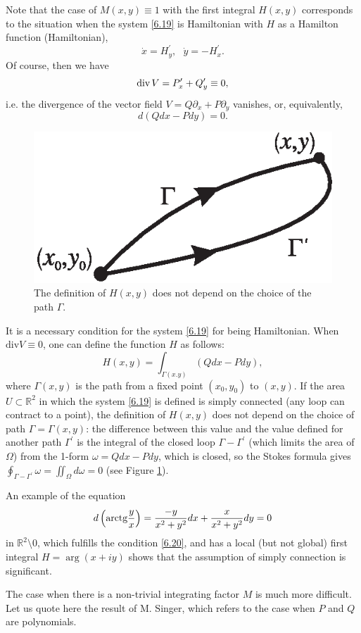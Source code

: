 \begin{example}
	Note that the case of $M (x, y) \equiv 1$ with the first integral $H (x, y)$ corresponds to the situation when the system \eqref{6.19} is Hamiltonian with $H$ as a Hamilton function (Hamiltonian),
	$$
	\dot{x}=H_{y}^{\prime },\text{ \ \ }\dot{y}=-H_{x}^{\prime }.
	$$
	Of course, then we have
	\begin{equation}
	\textrm{div\,}V=P_{x}^{\prime }+Q_{y}^{\prime }\equiv 0,  \label{6.20}
	\end{equation}
	i.e. the divergence of the vector field $V = Q \partial _{x} + P \partial _{y}$ vanishes, or, equivalently,
	$$
	d\left( Qdx-Pdy\right) =0.
	$$
	\begin{figure}[!ht]
		\centering
		\includegraphics [scale=1.4]{jtrA1}
		\caption{The definition of $H (x, y)$ does not depend on the choice of the path $\Gamma$.}
		\label{fig:A1}
	\end{figure}
	It is a necessary condition for the system \eqref{6.19} for being Hamiltonian. When $\textrm{div}V\equiv 0$, one can define the function $H$ as follows:
	$$
	H(x,y)=\int_{\Gamma (x.y)}\left( Qdx-Pdy\right) ,
	$$
	where $\Gamma (x,y)$ is the path from a fixed point $\left(x_{0}, y_{0}\right) $ to $(x, y)$. If the area $U\subset \mathbb{R}^{2}$ in which the system \eqref{6.19} is defined is simply connected (any loop can contract to a point), the definition of $H (x, y)$ does not depend on the choice of path $\Gamma =\Gamma (x,y)$: the difference between this value and the value defined for another path $\Gamma ^{\prime }$ is the integral of the closed loop $\Gamma -\Gamma ^{\prime }$ (which limits the area of $\Omega$) from the 1-form $\omega =Qdx-Pdy$, which is closed, so the Stokes formula gives $\oint_{\Gamma -\Gamma ^{\prime }}\omega
	=\iint_{\Omega }d\omega =0$ (see Figure \ref{fig:A1}).
	
	An example of the equation
	$$
	d\left( \textrm{arctg}\frac{y}{x}\right) =\frac{-y}{x^{2}+y^{2}}dx+\frac{x}{%
		x^{2}+y^{2}}dy=0
	$$
	in $\mathbb{R}^{2}\setminus 0$, which fulfills the condition \eqref{6.20}, and has a local (but not global) first integral $H=\arg \left(
	x+iy\right) $ shows that the assumption of simply connection is significant.
	
	The case when there is a non-trivial integrating factor $M$ is much more difficult. Let us quote here the result of M. Singer, which refers to the case when $P$ and $Q$ are polynomials.
\end{example}

